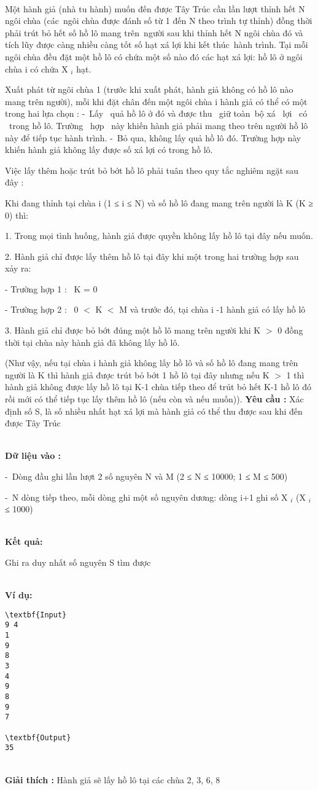 

 

Một hành giả (nhà tu hành) muốn đến được Tây Trúc cần lần lượt thỉnh hết N ngôi chùa (các ngôi chùa được đánh số từ 1 đến N theo trình tự thỉnh) đồng thời phải trút bỏ hết số hồ lô mang trên người sau khi thỉnh hết N ngôi chùa đó và tích lũy được càng nhiều càng tốt số hạt xá lợi khi kết thúc hành trình. Tại mỗi ngôi chùa đều đặt một hồ lô có chứa một số nào đó các hạt xá lợi: hồ lô ở ngôi  chùa i có chứa X $_ i $ hạt.

Xuất phát từ ngôi chùa 1 (trước khi xuất phát, hành giả không có hồ lô nào mang trên người), mỗi khi đặt chân đến một ngôi chùa i hành giả có thể có một trong hai lựa chọn : - Lấy  quả hồ lô ở đó và được thu  giữ toàn bộ xá  lợi  có  trong hồ lô. Trường  hợp  này khiến hành giả phải mang theo trên người hồ lô này để tiếp tục hành trình. - Bỏ qua, không lấy quả hồ lô đó. Trường hợp này khiến hành giả không lấy được số xá lợi có trong hồ lô.

Việc lấy thêm hoặc trút bỏ bớt hồ lô phải tuân theo quy tắc nghiêm ngặt sau đây :

Khi đang thỉnh tại chùa i (1 ≤ i ≤ N) và số hồ lô đang mang trên người là K (K ≥ 0) thì:

1. Trong mọi tình huống, hành giả được quyền không lấy hồ lô tại đây nếu muốn.

2. Hành giả chỉ được lấy thêm hồ lô tại đây khi một trong hai trường hợp sau xảy ra:

- Trường hợp 1 :  K = 0

- Trường hợp 2 :  0 $<$ K $<$ M và trước đó, tại chùa i -1 hành giả có lấy hồ lô

3. Hành giả chỉ được bỏ bớt đúng một hồ lô mang trên người khi K $>$ 0 đồng thời tại chùa này hành giả đã không lấy hồ lô.

(Như vậy, nếu tại chùa i hành giả không lấy hồ lô và số hồ lô đang mang trên người là K thì hành giả được trút bỏ bớt 1 hồ lô tại đây nhưng nếu K $>$ 1 thì hành giả không được lấy hồ lô tại K-1 chùa tiếp theo để trút bỏ hết K-1 hồ lô đó rồi mới có thể tiếp tục lấy thêm hồ lô (nếu còn và nếu muốn)). \textbf{ Yêu cầu : } Xác định số S, là số nhiều nhất hạt xá lợi mà hành giả có thể thu được sau khi đến được Tây Trúc


\\\textbf{Dữ liệu vào :}

- Dòng đầu ghi lần lượt 2 số nguyên N và M (2 ≤ N ≤ 10000; 1 ≤ M ≤ 500)

- N dòng tiếp theo, mỗi dòng ghi một số nguyên dương: dòng i+1 ghi số X $_ i $ (X $_ i $ ≤ 1000)


\\\textbf{Kết quả:}

Ghi ra duy nhất số nguyên S tìm được


\\\textbf{Ví dụ:}
\begin{verbatim}
\textbf{Input}
9 4
1
9
8
3
4
9
8
9
7

\textbf{Output}
35\end{verbatim}


\\\textbf{Giải thích : } Hành giả sẽ lấy hồ lô tại các chùa 2, 3, 6, 8